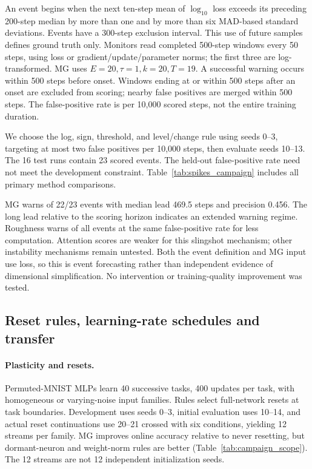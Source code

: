 {An event begins when the next ten-step mean of $\log_{10}$ loss exceeds its preceding 200-step median by more than one and by more than six MAD-based standard deviations. Events have a 300-step exclusion interval. This use of future samples defines ground truth only. Monitors read completed 500-step windows every 50 steps, using loss or gradient/update/parameter norms; the first three are log-transformed. MG uses $E=20,\tau=1,k=20,T=19$. A successful warning occurs within 500 steps before onset. Windows ending at or within 500 steps after an onset are excluded from scoring; nearby false positives are merged within 500 steps. The false-positive rate is per 10,000 scored steps, not the entire training duration.

We choose the log, sign, threshold, and level/change rule using seeds 0--3, targeting at most two false positives per 10,000 steps, then evaluate seeds 10--13. The 16 test runs contain 23 scored events. The held-out false-positive rate need not meet the development constraint. Table~\ref{tab:spikes_campaign} includes all primary method comparisons.

\begin{table}[htbp]
\centering\small
\caption{Spike warnings on the held-out transformer runs. Hits are events warned within 500 steps; FP/10k counts merged false warnings per scored training steps. AUROC uses the frozen score and future-onset label at evaluation times.}
\label{tab:spikes_campaign}

\end{table}

MG warns of 22/23 events with median lead 469.5 steps and precision 0.456. The long lead relative to the scoring horizon indicates an extended warning regime. Roughness warns of all events at the same false-positive rate for less computation. Attention scores are weaker for this slingshot mechanism; other instability mechanisms remain untested. Both the event definition and MG input use loss, so this is event forecasting rather than independent evidence of dimensional simplification. No intervention or training-quality improvement was tested.

\subsection{Reset rules, learning-rate schedules and transfer}
\paragraph{Plasticity and resets.}
Permuted-MNIST MLPs learn 40 successive tasks, 400 updates per task, with homogeneous or varying-noise input families. Rules select full-network resets at task boundaries. Development uses seeds 0--3, initial evaluation uses 10--14, and actual reset continuations use 20--21 crossed with six conditions, yielding 12 streams per family. MG improves online accuracy relative to never resetting, but dormant-neuron and weight-norm rules are better (Table~\ref{tab:campaign_scope}). The 12 streams are not 12 independent initialization seeds. 

}
